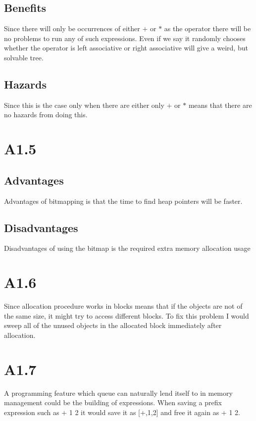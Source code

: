\documentclass[10pt,a4paper]{article}      %
\begin{document}
\subsection*{Benefits}
Since there will only be occurrences of either $+$ or $*$ as the operator there will be no problems to run any of such expressions. Even if we say it randomly chooses whether the operator is left associative or right associative will give a weird, but solvable tree.

\subsection*{Hazards}
Since this is the case only when there are either only $+$ or $*$ means that there are no hazards from doing this.


\section*{A1.5}
\subsection*{Advantages}
Advantages of bitmapping is that the time to find heap pointers will be faster.
\subsection*{Disadvantages}
Disadvantages of using the bitmap is the required extra memory allocation usage

\section*{A1.6}
Since allocation procedure works in blocks means that if the objects are not of the same size, it might try to access different blocks. To fix this problem I would sweep all of the unused objects in the allocated block immediately after allocation.

\section*{A1.7}
A programming feature which queue can naturally lend itself to in memory management could be the building of expressions. When saving a prefix expression such as + 1 2 it would save it as [+,1,2] and free it again as + 1 2.
\end{document}
